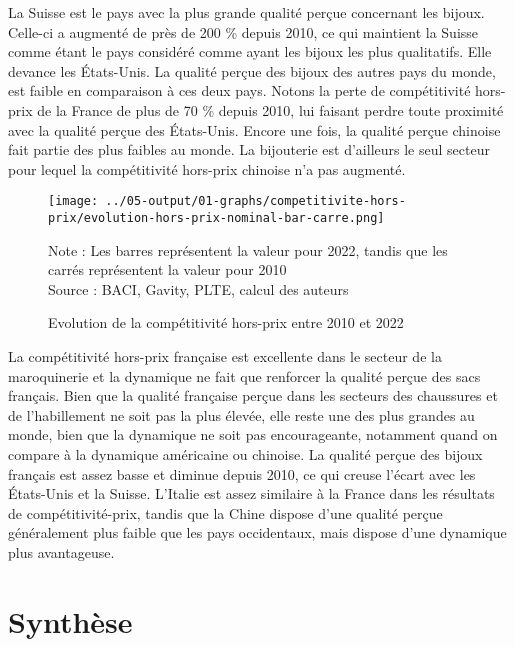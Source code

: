 \documentclass[french,10pt,a4paper]{article}
\begin{document}
La Suisse est le pays avec la plus grande qualité perçue concernant les bijoux. Celle-ci a augmenté de près de 200 \% depuis 2010, ce qui maintient la Suisse comme étant le pays considéré comme ayant les bijoux les plus qualitatifs. Elle devance les États-Unis. La qualité perçue des bijoux des autres pays du monde, est faible en comparaison à ces deux pays. Notons la perte de compétitivité hors-prix de la France de plus de 70 \% depuis 2010, lui faisant perdre toute proximité avec la qualité perçue des États-Unis. Encore une fois, la qualité perçue chinoise fait partie des plus faibles au monde. La bijouterie est d'ailleurs le seul secteur pour lequel la compétitivité hors-prix chinoise n'a pas augmenté. 

\begin{figure}[!h]
  \centering
  \texttt{[image: ../05-output/01-graphs/competitivite-hors-prix/evolution-hors-prix-nominal-bar-carre.png]}
  \captionsetup{justification=justified, singlelinecheck=false, font=small}
  \caption*{Note : Les barres représentent la valeur pour 2022, tandis que les carrés représentent la valeur pour 2010 \\
  Source : BACI, Gavity, PLTE, calcul des auteurs}
  \captionsetup{justification=centering, singlelinecheck=true, font=normalsize}
  \caption{Evolution de la compétitivité hors-prix entre 2010 et 2022}
  \label{fig:hors-prix}
\end{figure}

La compétitivité hors-prix française est excellente dans le secteur de la maroquinerie et la dynamique ne fait que renforcer la qualité perçue des sacs français. Bien que la qualité française perçue dans les secteurs des chaussures et de l'habillement ne soit pas la plus élevée, elle reste une des plus grandes au monde, bien que la dynamique ne soit pas encourageante, notamment quand on compare à la dynamique américaine ou chinoise. La qualité perçue des bijoux français est assez basse et diminue depuis 2010, ce qui creuse l'écart avec les États-Unis et la Suisse. L'Italie est assez similaire à la France dans les résultats de compétitivité-prix, tandis que la Chine dispose d'une qualité perçue généralement plus faible que les pays occidentaux, mais dispose d'une dynamique plus avantageuse. 


\section{Synthèse}
\end{document}
